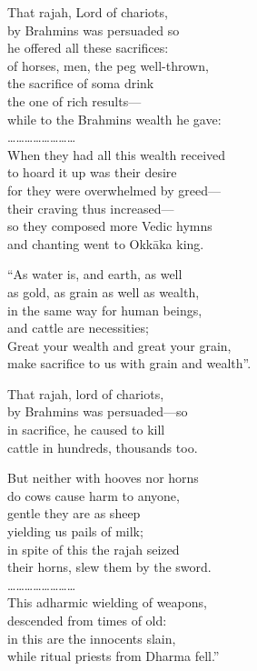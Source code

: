 \begin{myquote}
That rajah, Lord of chariots,\\ by Brahmins was persuaded so\\ he offered all these sacrifices:\\ of horses, men, the peg well-thrown,\\ the sacrifice of soma drink\\ the one of rich results—\\ while to the Brahmins wealth he gave:\\ ……………………\\ When they had all this wealth received\\ to hoard it up was their desire\\ for they were overwhelmed by greed—\\ their craving thus increased—\\ so they composed more Vedic hymns\\ and chanting went to Okkāka king.

“As water is, and earth, as well\\ as gold, as grain as well as wealth,\\ in the same way for human beings,\\ and cattle are necessities;\\ Great your wealth and great your grain,\\ make sacrifice to us with grain and wealth”.

That rajah, lord of chariots,\\ by Brahmins was persuaded—so\\ in sacrifice, he caused to kill\\ cattle in hundreds, thousands too.

But neither with hooves nor horns\\ do cows cause harm to anyone,\\ gentle they are as sheep\\ yielding us pails of milk;\\ in spite of this the rajah seized\\ their horns, slew them by the sword.\\ ……………………\\ This adharmic wielding of weapons,\\ descended from times of old:\\ in this are the innocents slain,\\ while ritual priests from Dharma fell.”
\end{myquote}

